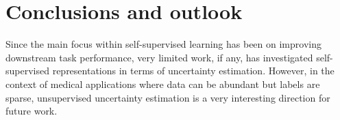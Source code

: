 
\chapter[conclusions and outlook]{Conclusions and outlook}\label{chp:conclusion}


Since the main focus within self-supervised learning has been on improving downstream task performance, very limited work, if any, has investigated self-supervised representations in terms of uncertainty estimation. 
However, in the context of medical applications where data can be abundant but labels are sparse, unsupervised uncertainty estimation is a very interesting direction for future work.




